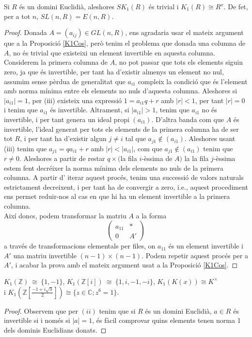 \begin{theorem}
Si $R$ és un domini Euclidià, aleshores $SK_1(R)$ és trivial i $K_1(R)\cong R^x$. De fet, per a tot $n$, $SL(n,R)=E(n,R)$.
\end{theorem}
\begin{proof}
Donada $A=(a_{ij})\in GL(n,R)$, ens agradaria usar el mateix argument que a la Proposició \ref{K1Cos}, però tenim el problema que donada una columna de $A$, no és trivial que existeixi un element invertible en aquesta columna. Considerem la primera columna de $A$, no pot passar que tots els elements siguin zero, ja que és invertible, per tant ha d'existir almenys un element no nul, assumim sense pèrdua de generalitat que $a_{i1}$ compleix la condició que és l'element amb norma mínima entre els elements no nuls d'aquesta columna. Aleshores si $|a_{i1}|=1$, per (iii) existeix una expressió $1=a_{i1}q+r$ amb $|r|<1$, per tant $|r|=0$ i tenim que $a_{i1}$ és invertible. Altrament, si $|a_{i1}|>1$, tenim que $a_{i1}$ no és invertible, i per tant genera un ideal propi $(a_{i1})$. D'altra banda com que $A$ és invertible, l'ideal generat per tots els elements de la primera columna ha de ser tot $R$, i per tant ha d'existir algun $j\neq i$ tal que $a_{j1}\not \in (a_{i1})$. Aleshores usant (iii) tenim que $a_{j1}=qa_{i1}+r$ amb $|r|<|a_{i1}|$, com que $a_{j1}\not \in (a_{i1})$ tenim que $r\neq 0$. Aleshores a partir de restar $q\times ($la fila $i$-èssima de $A)$ la la fila $j$-èssima estem fent decréixer la norma mínima dels elements no nuls de la primera columna. A partir d' iterar aquest procés, tenim una successió de valors naturals estrictament decreixent, i per tant ha de convergir a zero, i.e., aquest procediment ens permet reduir-nos al cas en que hi ha un element invertible a la primera columna. \\ Així doncs, podem transformar la matriu $A$ a la forma $$ \left( \begin{matrix}
  a_{11} & * \\
  0 & A'
 \end{matrix} \right)$$ a través de transformacions elementals per files, on $a_{11}$ és un element invertible i $A'$ una matriu invertible $(n-1)\times (n-1)$. Podem repetir aquest procés per a  $A'$, i acabar la prova amb el mateix argument usat a la Proposició \ref{K1Cos}.
\end{proof}

\begin{cor} \label{KZ}
$K_1(\mathbb{Z}) \ \cong \ \{1,-1\}$, $K_1(\mathbb{Z}[i]) \ \cong \ \{1,i, -1, -i\}$,      
 $K_1(K(x))\cong K^\times $\\ i $K_1(\mathbb{Z}[\frac{-1+i\sqrt{3}}{2}])\cong \{ z\in \mathbb{C} ; z^6 = 1\}$.
\end{cor}
\begin{proof}
Observem que per $(ii)$ tenim que si $R$ és un domini Euclidià, $a\in R$ és invertible si i només si $|a|=1$, és fàcil comprovar quins elements tenen norma 1 dels dominis Euclidians donats.
\end{proof}
